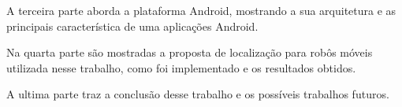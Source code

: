   A terceira parte aborda a plataforma Android, mostrando a sua arquitetura e as principais característica de uma aplicações Android.
  
  Na quarta parte são mostradas a proposta de localização para robôs móveis utilizada nesse trabalho, como foi implementado e os resultados obtidos.
  
  A ultima parte traz a conclusão desse trabalho e os possíveis trabalhos futuros.

\begin{comment}
  A primeira parte aborda o tópico construção de mapas, apresentando as principais técnicas de construção de mapas e mostra um pouco sobre o problema de auto localização e mapeamento simultâneos.
  
  A segunda parte mostra como pode-se obter a localização de um nodo, utilizando redes de sensores sem fio, e trás um resumo do método de localização a ser utilizado no sistema 
  de navegação.
  
  A terceira parte apresenta o problema planejamento de trajetos, e mostra algumas técnicas utilizadas na solução desse problema.
  
  A quarta parte mostra como será implementado o sistema proposto nesse trabalho, para as plataformas Android e Arduino.
  
  A quinta parte faz a conclusão desse trabalho e apresenta uma breve discussão sobre trabalhos futuros.
\end{comment}